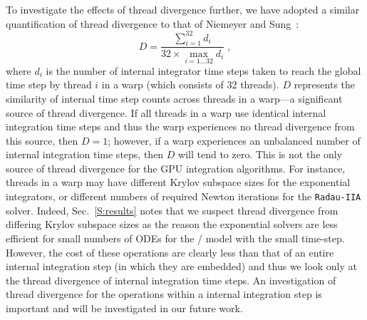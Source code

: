 \documentclass[final,twocolumn]{elsarticle}
\begin{document}
To investigate the effects of thread divergence further, we have adopted a similar quantification of thread divergence to that of Niemeyer and Sung~\cite{Niemeyer:2014aa}:
\begin{equation}
	D = \frac{\sum_{i=1}^{32}{d_i}}{32 \times \max\limits_{i = 1\dots32} d_i} \;,
	\label{eqn:divergence}
\end{equation}
where $d_i$ is the number of internal integrator time steps taken to reach the global time step by thread $i$ in a warp (which consists of 32 threads).
$D$ represents the similarity of internal time step counts across threads in a warp---a significant source of thread divergence.
If all threads in a warp use identical internal integration time steps and thus the warp experiences no thread divergence from this source, then $D = 1$; however, if a warp experiences an unbalanced number of internal integration time steps, then $D$ will tend to zero.
This is not the only source of thread divergence for the GPU integration algorithms.
For instance, threads in a warp may have different Krylov subspace sizes for the exponential integrators, or different numbers of required Newton iterations for the \texttt{Radau-IIA} solver.
Indeed, Sec.~\ref{S:results} notes that we suspect thread divergence from differing Krylov subspace sizes as the reason the exponential solvers are less efficient for small numbers of ODEs for the \slash{} model with the small time-step.
However, the cost of these operations are clearly less than that of an entire internal integration step (in which they are embedded) and thus we look only at the thread divergence of internal integration time steps.
An investigation of thread divergence for the operations within a internal integration step is important and will be investigated in our future work.
\end{document}
